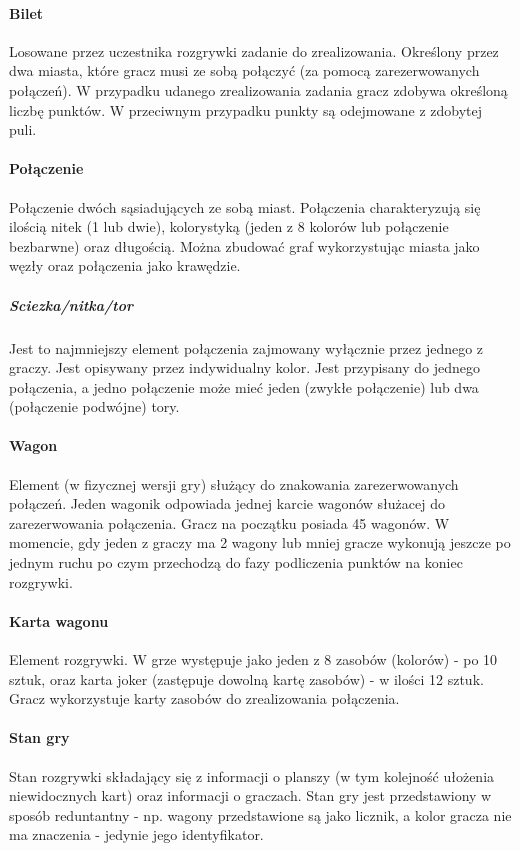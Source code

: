 \documentclass[12pt, oneside]{report}
\begin{document}
\paragraph{Bilet}
\label{dictionary:bilet}
Losowane przez uczestnika rozgrywki zadanie do zrealizowania. Określony przez dwa miasta, które gracz musi ze sobą połączyć (za pomocą zarezerwowanych połączeń). W przypadku udanego zrealizowania zadania gracz zdobywa określoną liczbę punktów. W przeciwnym przypadku punkty są odejmowane z zdobytej puli.
\paragraph{Połączenie}
Połączenie dwóch sąsiadujących ze sobą miast. Połączenia charakteryzują się ilością nitek (1 lub dwie), kolorystyką (jeden z 8 kolorów lub połączenie bezbarwne) oraz długością. Można zbudować graf wykorzystując miasta jako węzły oraz połączenia jako krawędzie.
\subparagraph{Sciezka/nitka/tor} 
Jest to najmniejszy element połączenia zajmowany wyłącznie przez jednego z graczy. Jest opisywany przez indywidualny kolor. Jest przypisany do jednego połączenia, a jedno połączenie może mieć jeden (zwykłe połączenie) lub dwa (połączenie podwójne) tory.
\paragraph{Wagon} Element (w fizycznej wersji gry) służący do znakowania zarezerwowanych połączeń. Jeden wagonik odpowiada jednej karcie wagonów służacej do zarezerwowania połączenia. Gracz na początku posiada 45 wagonów. W momencie, gdy jeden z graczy ma 2 wagony lub mniej gracze wykonują jeszcze po jednym ruchu po czym przechodzą do fazy podliczenia punktów na koniec rozgrywki.
\paragraph{Karta wagonu} Element rozgrywki. W grze występuje jako jeden z 8 zasobów (kolorów) - po 10 sztuk, oraz karta joker (zastępuje dowolną kartę zasobów) - w ilości 12 sztuk. Gracz wykorzystuje karty zasobów do zrealizowania połączenia.
\paragraph{Stan gry} Stan rozgrywki składający się z informacji o planszy (w tym kolejność ułożenia niewidocznych kart) oraz informacji o graczach. Stan gry jest przedstawiony w sposób reduntantny - np. wagony przedstawione są jako licznik, a kolor gracza nie ma znaczenia - jedynie jego identyfikator.
\end{document}
